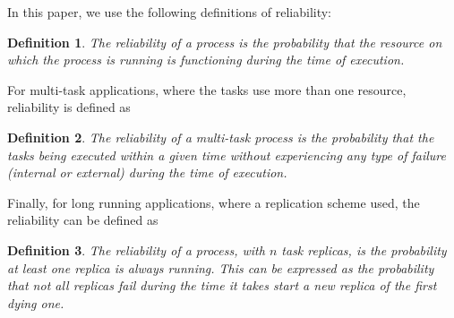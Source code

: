 \documentclass{cslthse-msc}
\newtheorem{definition}{Definition}[chapter]
\begin{document}
In this paper, we use the following definitions of reliability:
\begin{definition} \label{def:single_task_reliability}
The reliability of a process is the probability that the resource on which the process is running is functioning during the time of execution.
\end{definition}

For multi-task applications, where the tasks use more than one resource, reliability is defined as
\begin{definition} \label{def:multi_task_reliability}
The reliability of a multi-task process is the probability that the tasks being executed within a given time without experiencing any type of failure (internal or external) during the time of execution.
\end{definition}

Finally, for long running applications, where a replication scheme used, the reliability can be defined as
\begin{definition} \label{def:task_replica_reliability}
The reliability of a process, with $n$ task replicas, is the probability at least one replica is always running. This can be expressed as the probability that not all replicas fail during the time it takes start a new replica of the first dying one.
\end{definition}
\end{document}
